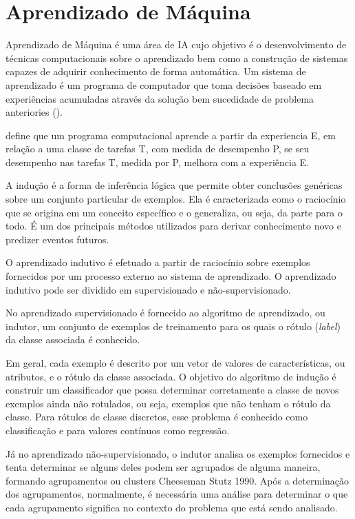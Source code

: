 \section{Aprendizado de Máquina}

Aprendizado de Máquina é uma área de IA cujo objetivo é o desenvolvimento de técnicas computacionais sobre o aprendizado bem como a construção de sistemas capazes de adquirir conhecimento de forma automática. Um sistema de aprendizado é um programa de computador que toma decisões baseado em experiências acumuladas através da solução bem sucedidade de problema anteriories (\cite{Monard2003}). 

\cite{mitchell1997} define que um programa computacional aprende a partir da experiencia E, em relação a uma classe de tarefas T, com medida de desempenho P, se seu desempenho nas tarefas T, medida por P, melhora com a experiência E.


A indução é a forma de inferência lógica que permite obter conclusões genéricas sobre um
conjunto particular de exemplos. Ela é caracterizada como o raciocínio que se origina em um conceito específico e o generaliza, ou seja, da parte para o todo. É um dos principais métodos utilizados para derivar conhecimento novo e predizer eventos futuros. 


O aprendizado indutivo é efetuado a partir de raciocínio sobre exemplos fornecidos por um processo externo ao sistema de aprendizado. O aprendizado indutivo pode ser dividido em supervisionado e não-supervisionado. 


No aprendizado supervisionado é fornecido ao algoritmo de aprendizado, ou indutor, um conjunto de exemplos de treinamento para os quais o rótulo (\textit{label}) da classe associada é conhecido.

Em geral, cada exemplo é descrito por um vetor de valores de características, ou atributos, e o rótulo da classe associada. O objetivo do algoritmo de indução é construir um classificador que possa determinar corretamente a classe de novos exemplos ainda não rotulados, ou seja, exemplos que não tenham o rótulo da classe. Para rótulos de classe discretos, esse problema é conhecido como classificação e para valores contínuos como regressão.

Já no aprendizado não-supervisionado, o indutor analisa os exemplos fornecidos e tenta determinar se alguns deles podem ser agrupados de alguma maneira, formando agrupamentos ou clusters Cheeseman  Stutz 1990. Após a determinação dos agrupamentos, normalmente, é necessária uma análise para determinar o que cada agrupamento significa no contexto do problema que está sendo analisado.


